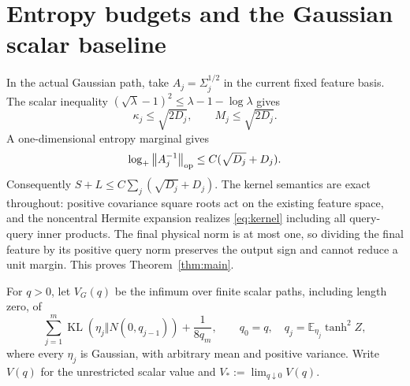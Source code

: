 \documentclass[11pt]{article}
\theoremstyle{remark}\newtheorem{remark}[theorem]{Remark}
\newcommand{\E}{\mathbb E}
\newcommand{\KL}{\operatorname{KL}}
\newcommand{\norm}[1]{\left\lVert #1\right\rVert}
\begin{document}
\section{Entropy budgets and the Gaussian scalar baseline}

In the actual Gaussian path, take $A_j=\Sigma_j^{1/2}$ in the current
fixed feature basis. The scalar inequality
$(\sqrt\lambda-1)^2\le\lambda-1-\log\lambda$ gives
\[
 \kappa_j\le\sqrt{2D_j},\qquad M_j\le\sqrt{2D_j}.
\]
A one-dimensional entropy marginal gives
\[
 \log_+\norm{A_j^{-1}}_{\rm op}
    \le C(\sqrt{D_j}+D_j).
\]
Consequently $S+L\le C\sum_j(\sqrt{D_j}+D_j)$. The kernel semantics
are exact throughout: positive covariance square roots act on the existing
feature space, and the noncentral Hermite expansion realizes
\eqref{eq:kernel} including all query-query inner products. The final
physical norm is at most one, so dividing the final feature by its positive
query norm preserves the output sign and cannot reduce a unit margin.
This proves Theorem~\ref{thm:main}.

For $q>0$, let $V_G(q)$ be the infimum over finite scalar paths, including
length zero, of
\[
 \sum_{j=1}^m\KL(\eta_j\Vert N(0,q_{j-1}))+\frac1{8q_m},
 \qquad q_0=q,\quad q_j=\E_{\eta_j}\tanh^2 Z,
\]
where every $\eta_j$ is Gaussian, with arbitrary mean and positive
variance. Write $V(q)$ for the unrestricted scalar value and
$V_*:=\lim_{q\downarrow0}V(q)$.
\end{document}
